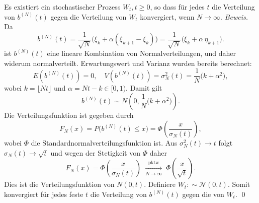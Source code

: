 \begin{lemma}
Es existiert ein stochastischer Prozess $W_t, t \geq 0$, so dass für jedes $t$ die Verteilung von $b^{(N)}(t)$ gegen die Verteilung von $W_t$ konvergiert, wenn $N \to \infty$.
\textit{Beweis.}
Da 
$$b^{(N)}(t) = \frac{1}{\sqrt{N}}\big(\xi_k+\alpha(\xi_{k+1}-\xi_k)\big)
=\frac{1}{\sqrt{N}}\big(\xi_k+\alpha\,\eta_{k+1}\big).
$$
ist $b^{(N)}(t)$ eine lineare Kombination von Normalverteilungen, und daher widerum 
normalverteilt. Erwartungswert und Varianz wurden bereits berechnet:
$$
E(b^{(N)}(t)) = 0, \quad V(b^{(N)}(t)) = \sigma_N^2(t) = \frac{1}{N}\big(k+\alpha^2\big),
$$
wobei $k=\lfloor Nt \rfloor$ und $\alpha=Nt-k\in[0,1)$. Damit gilt
$$
b^{(N)}(t) \sim N\left(0,\frac{1}{N}\big(k+\alpha^2\big)\right).
$$
Die Verteilungsfunktion ist gegeben durch
$$
F_N(x)=P\big(b^{(N)}(t)\le x\big)=\Phi\!\left(\frac{x}{\sigma_N(t)}\right),
$$
wobei $\Phi$ die Standardnormalverteilungsfunktion ist. Aus $\sigma_N^2(t)\to t$ folgt $\sigma_N(t)\to \sqrt{t}$ und wegen der Stetigkeit von $\Phi$ daher
$$
F_N(x)=\Phi\!\left(\frac{x}{\sigma_N(t)}\right)\; \xrightarrow[N \to \infty]{\mathrm{pktw}} \;\Phi\!\left(\frac{x}{\sqrt{t}}\right).
$$
Dies ist die Verteilungsfunktion von $N(0,t)$. Definiere $W_t :\sim \mathcal N(0,t)$. Somit konvergiert für jedes feste $t$ die Verteilung von $b^{(N)}(t)$ gegen die von $W_t$. 
\qed
\end{lemma}

